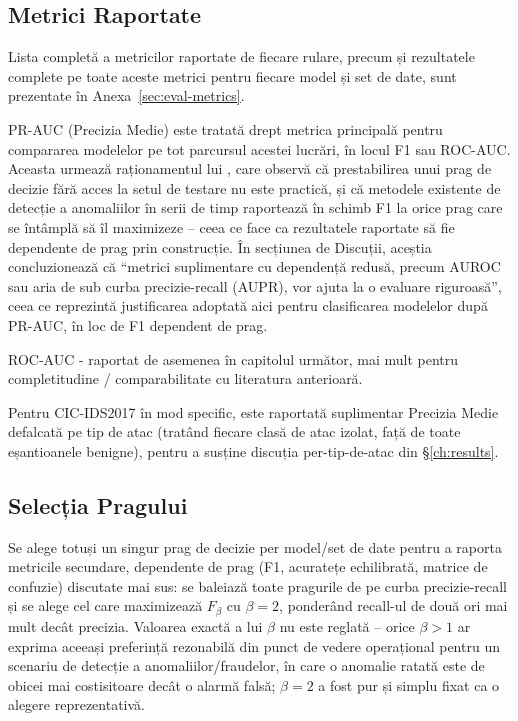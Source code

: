 \subsection{Metrici Raportate}

Lista completă a metricilor raportate de fiecare rulare, precum și rezultatele complete pe toate aceste metrici pentru fiecare model și set de date, sunt prezentate în Anexa~\ref{sec:eval-metrics}.

PR-AUC (Precizia Medie) este tratată drept metrica principală pentru compararea modelelor pe tot parcursul acestei lucrări, în locul F1 sau ROC-AUC. Aceasta urmează raționamentul lui \textcite{kim2022rigorous}, care observă că prestabilirea unui prag de decizie fără acces la setul de testare nu este practică, și că metodele existente de detecție a anomaliilor în serii de timp raportează în schimb F1 la orice prag care se întâmplă să îl maximizeze -- ceea ce face ca rezultatele raportate să fie dependente de prag prin construcție. În secțiunea de Discuții, aceștia concluzionează că \enquote{metrici suplimentare cu dependență redusă, precum AUROC sau aria de sub curba precizie-recall (AUPR), vor ajuta la o evaluare riguroasă}, ceea ce reprezintă justificarea adoptată aici pentru clasificarea modelelor după PR-AUC, în loc de F1 dependent de prag.

ROC-AUC - raportat de asemenea în capitolul următor, mai mult pentru completitudine / comparabilitate cu literatura anterioară.

Pentru CIC-IDS2017 în mod specific, este raportată suplimentar Precizia Medie defalcată pe tip de atac (tratând fiecare clasă de atac izolat, față de toate eșantioanele benigne), pentru a susține discuția per-tip-de-atac din \S\ref{ch:results}.

\subsection{Selecția Pragului}

Se alege totuși un singur prag de decizie per model/set de date pentru a raporta metricile secundare, dependente de prag (F1, acuratețe echilibrată, matrice de confuzie) discutate mai sus: se baleiază toate pragurile de pe curba precizie-recall și se alege cel care maximizează $F_\beta$ cu $\beta=2$, ponderând recall-ul de două ori mai mult decât precizia. Valoarea exactă a lui $\beta$ nu este reglată -- orice $\beta>1$ ar exprima aceeași preferință rezonabilă din punct de vedere operațional pentru un scenariu de detecție a anomaliilor/fraudelor, în care o anomalie ratată este de obicei mai costisitoare decât o alarmă falsă; $\beta=2$ a fost pur și simplu fixat ca o alegere reprezentativă.

